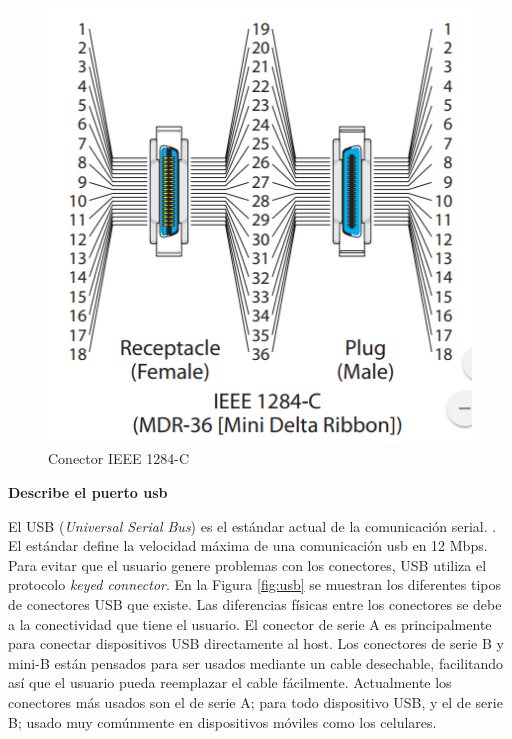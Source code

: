 \documentclass[a4paper,12pt]{article}
\begin{document}
\begin{enumerate}
  \begin{figure}
   \centering
   \includegraphics[scale = 0.4]{5.png}
   \caption{Conector IEEE 1284-C \cite{IEEEparallel}}
   \label{fig:IEEE3}
  \end{figure}
 
 \newpage
 
 {\large \item \textbf{Describe el puerto usb}} \par
 El USB (\textit{Universal Serial Bus}) es el estándar actual de la comunicación serial. \cite{usb}. El estándar define la velocidad máxima de una comunicación
 usb en 12 Mbps. Para evitar que el usuario genere problemas con los conectores, USB utiliza el protocolo \textit{keyed connector}. En la Figura
 \ref{fig:usb} se muestran los diferentes tipos de conectores USB que existe. Las diferencias físicas entre los conectores se debe a la conectividad que tiene el usuario.
 El conector de serie A es principalmente para conectar dispositivos USB directamente al host. Los conectores de serie B y mini-B
 están pensados para ser usados mediante un cable desechable, facilitando así que el usuario pueda reemplazar el cable fácilmente.
 Actualmente los conectores más usados son el de serie A; para todo dispositivo USB, y el de serie B; usado muy comúnmente en dispositivos móviles como
 los celulares.
 

\end{enumerate}
\end{document}
